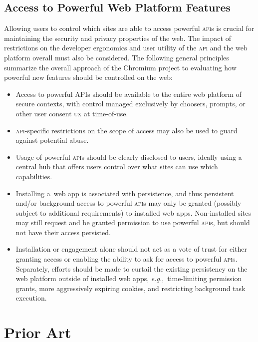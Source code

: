 \documentclass[sigconf, anonymous]{acmart}
\begin{document}
\subsection{Access to Powerful Web Platform Features}

Allowing users to control which sites are able to access powerful \textsc{api}s
is crucial for maintaining the security and privacy properties of the web.
The impact of restrictions on the developer ergonomics and user utility
of the \textsc{api} and the web platform overall must also be considered.
The following general principles~\cite{ng19} summarize the overall approach of the Chromium project
to evaluating how powerful new features should be controlled on the web:

\begin{itemize}
  \item Access to powerful APIs should be available to the entire web platform of secure contexts,
    with control managed exclusively by choosers, prompts,
    or other user consent \textsc{ux} at time-of-use.
  \item \textsc{api}-specific restrictions on the scope of access may also be used
    to guard against potential abuse.
  \item Usage of powerful \textsc{api}s should be clearly disclosed to users,
    ideally using a central hub that offers users control over what sites
    can use which capabilities.
  \item Installing a~web app is associated with persistence,
    and thus persistent and/or background access to powerful \textsc{api}s
    may only be granted (possibly subject to additional requirements) to installed web apps.
    Non-installed sites may still request and be granted permission to use powerful \textsc{api}s,
    but should not have their access persisted.
  \item Installation or engagement alone should not act as a vote of trust
    for either granting access or enabling the ability to ask for access to powerful \textsc{api}s.
    Separately, efforts should be made to curtail the existing persistency
    on the web platform outside of installed web apps, \textit{e.g.},\ time-limiting permission grants,
    more aggressively expiring cookies, and restricting background task execution.
\end{itemize}

\section{Prior Art}
\end{document}

